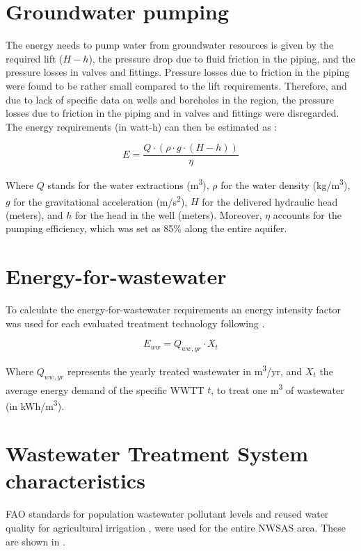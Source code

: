 \documentclass[12pt]{iopart}
\begin{document}
\section{Groundwater pumping}\label{Sc:pumping}
The energy needs to pump water from groundwater resources is given by the required lift ($H-h$), the pressure drop due to fluid friction in the piping, and the pressure losses in valves and fittings. Pressure losses due to friction in the piping were found to be rather small compared to the lift requirements. Therefore, and due to lack of specific data on wells and boreholes in the region, the pressure losses due to friction in the piping and in valves and fittings were disregarded. The energy requirements (in watt-h) can then be estimated as  \cite{Groundwaterdependentirrigationcosts2017}:

\begin{equation}\label{eq:1}
E = \frac{Q\cdot(\rho\cdot g\cdot(H - h))}{\eta}
\end{equation}

Where $Q$ stands for the water extractions (m\textsuperscript{3}), $\rho$ for the water density (kg/m\textsuperscript{3}), $g$ for the gravitational acceleration (m/s\textsuperscript{2}), $H$ for the delivered hydraulic head (meters), and $h$ for the head in the well (meters). Moreover, $\eta$ accounts for the pumping efficiency, which was set as 85\% along the entire aquifer.

\section{Energy-for-wastewater}\label{Sc:eww}
To calculate the energy-for-wastewater requirements an energy intensity factor was used for each evaluated treatment technology following .

\begin{equation}\label{eq:energy-for-wastewater}
E_{ww} = Q_{ww,yr}\cdot X_t
\end{equation}

Where $Q_{ww,yr}$ represents the yearly treated wastewater in m\textsuperscript{3}/yr, and $X_t$ the average energy demand of the specific WWTT $t$, to treat one m\textsuperscript{3} of wastewater (in kWh/m\textsuperscript{3}).

\section{Wastewater Treatment System characteristics}
FAO standards for population wastewater pollutant levels and reused water quality for agricultural irrigation \cite{fao1985water}, were used for the entire NWSAS area. These are shown in .
\end{document}
